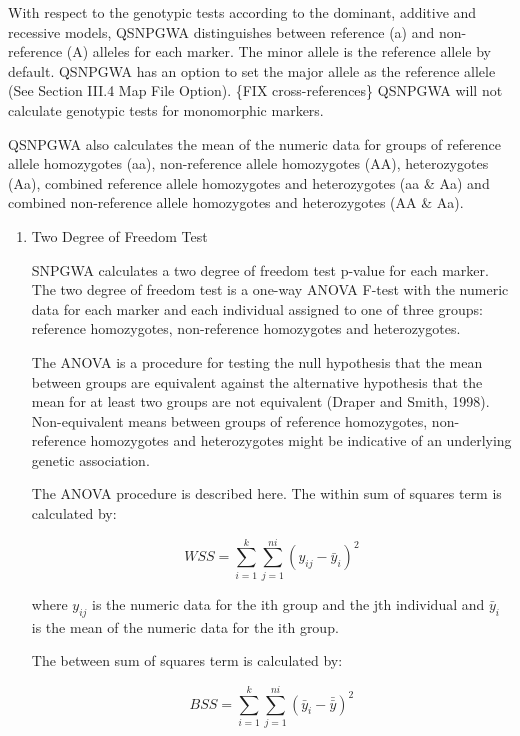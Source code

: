 With respect to the genotypic tests according to the dominant, additive and
recessive models, QSNPGWA distinguishes between reference (a) and non-reference
(A) alleles for each marker.  The minor allele is the reference allele by
default.  QSNPGWA has an option to set the major allele as the reference allele
(See Section III.4 Map File Option). \{FIX cross-references\} QSNPGWA will not
calculate genotypic tests for monomorphic markers.

QSNPGWA also calculates the mean of the numeric data for groups of reference
allele homozygotes (aa), non-reference allele homozygotes (AA), heterozygotes
(Aa), combined reference allele homozygotes and heterozygotes (aa \& Aa) and
combined non-reference allele homozygotes and heterozygotes (AA \& Aa).

\begin{enumerate}

\item{Two Degree of Freedom Test}


  SNPGWA calculates a two degree of freedom test p-value for each marker.  The
  two degree of freedom test is a one-way ANOVA F-test with the numeric data for
  each marker and each individual assigned to one of three groups: reference
  homozygotes, non-reference homozygotes and heterozygotes.

  The ANOVA is a procedure for testing the null hypothesis that the mean between
  groups are equivalent against the alternative hypothesis that the mean for at
  least two groups are not equivalent (Draper and Smith, 1998).
  Non-equivalent means between groups of reference homozygotes, non-reference
  homozygotes and heterozygotes might be indicative of an underlying genetic
  association.

  The ANOVA procedure is described here.  The within sum of squares term is
  calculated by:

  \begin{equation*}
    WSS = \sum^k_{i=1}\sum^{n{i}}_{j=1}\left(y_{ij} - \bar{y}_i\right)^2
  \end{equation*}

  where $y_{ij}$ is the numeric data for the ith group and the jth individual
  and $\bar{y}_i$ is the mean of the numeric data for the ith group.

  The between sum of squares term is calculated by:

  \begin{equation*}
    BSS = \sum^k_{i=1}\sum^{n{i}}_{j=1}\left(\bar{y}_i - \bar{\bar{y}}\right)^2    
  \end{equation*}


\end{enumerate}
